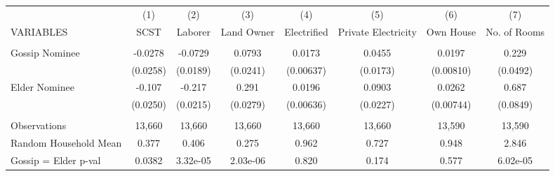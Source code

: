 \begin{tabular}{lccccccc} \hline
 & (1) & (2) & (3) & (4) & (5) & (6) & (7) \\
VARIABLES & SCST & Laborer & Land Owner & Electrified & Private Electricity & Own House & No. of Rooms \\ \hline
 &  &  &  &  &  &  &  \\
Gossip Nominee & -0.0278 & -0.0729 & 0.0793 & 0.0173 & 0.0455 & 0.0197 & 0.229 \\
 & (0.0258) & (0.0189) & (0.0241) & (0.00637) & (0.0173) & (0.00810) & (0.0492) \\
Elder Nominee & -0.107 & -0.217 & 0.291 & 0.0196 & 0.0903 & 0.0262 & 0.687 \\
 & (0.0250) & (0.0215) & (0.0279) & (0.00636) & (0.0227) & (0.00744) & (0.0849) \\
 &  &  &  &  &  &  &  \\
Observations & 13,660 & 13,660 & 13,660 & 13,660 & 13,660 & 13,590 & 13,590 \\
Random Household Mean & 0.377 & 0.406 & 0.275 & 0.962 & 0.727 & 0.948 & 2.846 \\
 Gossip = Elder p-val & 0.0382 & 3.32e-05 & 2.03e-06 & 0.820 & 0.174 & 0.577 & 6.02e-05 \\ \hline
\end{tabular}
